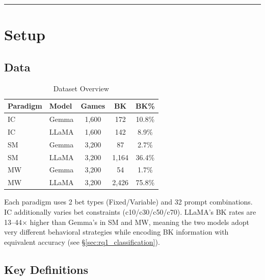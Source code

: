 \documentclass[11pt,a4paper]{article}
\begin{document}
\bigskip\hrule\bigskip

\section{Setup}

\subsection{Data}

\begin{table}[H]
\centering
\caption{Dataset Overview}
\begin{tabular}{llccc}
\toprule
\textbf{Paradigm} & \textbf{Model} & \textbf{Games} & \textbf{BK} & \textbf{BK\%} \\
\midrule
IC & Gemma & 1{,}600 & 172 & 10.8\% \\
IC & LLaMA & 1{,}600 & 142 & 8.9\% \\
SM & Gemma & 3{,}200 & 87 & 2.7\% \\
SM & LLaMA & 3{,}200 & 1{,}164 & 36.4\% \\
MW & Gemma & 3{,}200 & 54 & 1.7\% \\
MW & LLaMA & 3{,}200 & 2{,}426 & 75.8\% \\
\bottomrule
\end{tabular}
\end{table}

Each paradigm uses 2 bet types (Fixed/Variable) and 32 prompt combinations. IC additionally varies bet constraints (c10/c30/c50/c70). LLaMA's BK rates are 13--44$\times$ higher than Gemma's in SM and MW, meaning the two models adopt very different behavioral strategies while encoding BK information with equivalent accuracy (see \S\ref{sec:rq1_classification}).

\subsection{Key Definitions}
\end{document}
